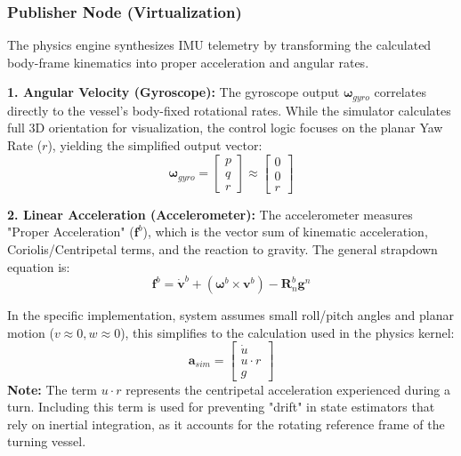 \documentclass[12pt, a4paper, oneside]{report}
\begin{document}
\subsubsection{Publisher Node (Virtualization)}
The physics engine synthesizes IMU telemetry by transforming the calculated body-frame kinematics into proper acceleration and angular rates.

\textbf{1. Angular Velocity (Gyroscope):}
The gyroscope output $\boldsymbol{\omega}_{gyro}$ correlates directly to the vessel's body-fixed rotational rates. While the simulator calculates full 3D orientation for visualization, the control logic focuses on the planar Yaw Rate ($r$), yielding the simplified output vector:
\begin{equation}
    \boldsymbol{\omega}_{gyro} = \begin{bmatrix} p \\ q \\ r \end{bmatrix} \approx \begin{bmatrix} 0 \\ 0 \\ r \end{bmatrix}
\end{equation}

\textbf{2. Linear Acceleration (Accelerometer):}
The accelerometer measures "Proper Acceleration" ($\mathbf{f}^b$), which is the vector sum of kinematic acceleration, Coriolis/Centripetal terms, and the reaction to gravity. The general strapdown equation is:
\begin{equation}
    \mathbf{f}^b = \dot{\mathbf{v}}^b + (\boldsymbol{\omega}^b \times \mathbf{v}^b) - \mathbf{R}_n^b \mathbf{g}^n
\end{equation}

In the specific implementation, system assumes small roll/pitch angles and planar motion ($v \approx 0, w \approx 0$), this simplifies to the calculation used in the physics kernel:
\begin{equation}
    \mathbf{a}_{sim} = \begin{bmatrix}
    \dot{u} \\
    u \cdot r \\
    g
    \end{bmatrix}
\end{equation}
\textbf{Note:} The term $u \cdot r$ represents the centripetal acceleration experienced during a turn. Including this term is used for preventing "drift" in state estimators that rely on inertial integration, as it accounts for the rotating reference frame of the turning vessel.
\end{document}
